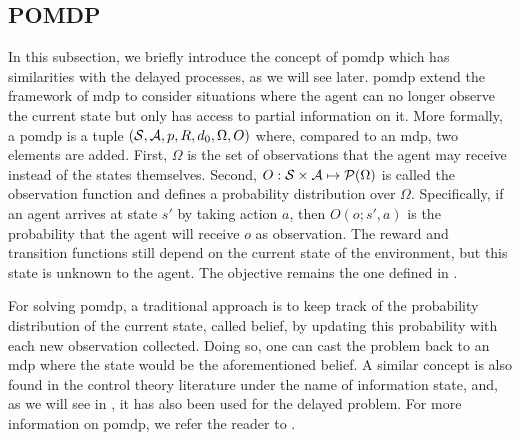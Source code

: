 \subsection{POMDP}
\label{subsec:pomdp}

In this subsection, we briefly introduce the concept of \gls{pomdp} \cite{kaelbling1998planning} which has similarities with the delayed processes, as we will see later.
\gls{pomdp} extend the framework of \gls{mdp} to consider situations where the agent can no longer observe the current state but only has access to partial information on it. 
More formally, a \gls{pomdp} is a tuple $(\mathcal{S},\mathcal{A}, p, R, d_0, \Omega, O)$ where, compared to an \gls{mdp}, two elements are added. 
First, $\Omega$ is the set of observations that the agent may receive instead of the states themselves. 
Second, $O:\mathcal{S}\times\mathcal{A}\mapsto \mathcal{P}(\Omega)$ is called the observation function and defines a probability distribution over $\Omega$. 
Specifically, if an agent arrives at state $s'$ by taking action $a$, then $O(o; s',a)$ is the probability that the agent will receive $o$ as observation.
The reward and transition functions still depend on the current state of the environment, but this state is unknown to the agent. 
The objective remains the one defined in .

For solving \gls{pomdp}, a traditional approach is to keep track of the probability distribution of the current state, called belief, by updating this probability with each new observation collected. 
Doing so, one can cast the problem back to an \gls{mdp} where the state would be the aforementioned belief.
A similar concept is also found in the control theory literature \cite{kumar2015stochastic} under the name of information state, and, as we will see in , it has also been used for the delayed problem. 
For more information on \gls{pomdp}, we refer the reader to \cite{hauskrecht2000value, spaan2012partially}.
